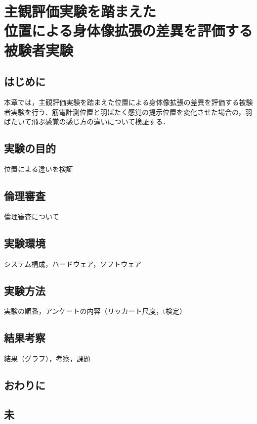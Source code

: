 \chapter[主観評価実験を踏まえた位置による身体像拡張の差異を評価する被験者実験]%
        {主観評価実験を踏まえた\\位置による身体像拡張の差異を評価する\\被験者実験}

\section{はじめに}
        本章では，主観評価実験を踏まえた位置による身体像拡張の差異を評価する被験者実験を行う．筋電計測位置と羽ばたく感覚の提示位置を変化させた場合の，羽ばたいて飛ぶ感覚の感じ方の違いについて検証する．

\section{実験の目的}
        位置による違いを検証

\section{倫理審査}
        倫理審査について

\section{実験環境}
        システム構成，ハードウェア，ソフトウェア

\section{実験方法}
        実験の順番，アンケートの内容（リッカート尺度，t検定）

\section{結果考察}
        結果（グラフ），考察，課題

\section{おわりに}

\section{未}

